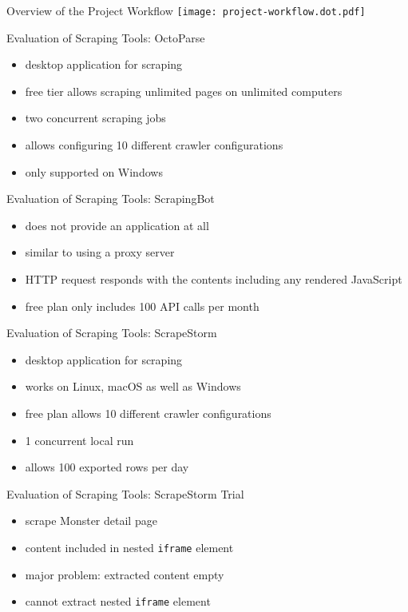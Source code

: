 \documentclass[aspectratio=169]{beamer}
\begin{document}
  \begin{frame}{Overview of the Project Workflow}
    \texttt{[image: project-workflow.dot.pdf]}
  \end{frame}

  \begin{frame}{Evaluation of Scraping Tools: OctoParse}
    \begin{itemize}
      \item desktop application for scraping
      \item free tier allows scraping unlimited pages on unlimited computers
      \item two concurrent scraping jobs
      \item allows configuring 10 different crawler configurations
      \item only supported on Windows
    \end{itemize}
  \end{frame}

  \begin{frame}{Evaluation of Scraping Tools: ScrapingBot}
    \begin{itemize}
      \item does not provide an application at all
      \item similar to using a proxy server
      \item HTTP request responds with the contents including any rendered JavaScript
      \item free plan only includes 100 API calls per month
    \end{itemize}
  \end{frame}

  \begin{frame}{Evaluation of Scraping Tools: ScrapeStorm}
    \begin{itemize}
      \item desktop application for scraping
      \item works on Linux, macOS as well as Windows
      \item free plan allows 10 different crawler configurations
      \item 1 concurrent local run
      \item allows 100 exported rows per day
    \end{itemize}
  \end{frame}

  \begin{frame}{Evaluation of Scraping Tools: ScrapeStorm Trial}
    \begin{itemize}
      \item scrape Monster detail page
      \item content included in nested \texttt{iframe} element
      \item major problem: extracted content empty
      \item cannot extract nested \texttt{iframe} element
    \end{itemize}
  \end{frame}
\end{document}
